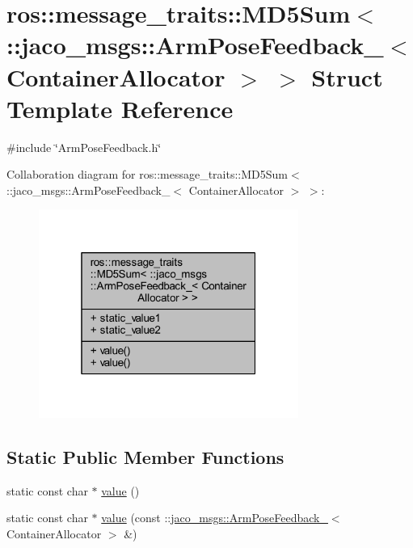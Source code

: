 \hypertarget{structros_1_1message__traits_1_1MD5Sum_3_01_1_1jaco__msgs_1_1ArmPoseFeedback___3_01ContainerAllocator_01_4_01_4}{}\section{ros\+:\+:message\+\_\+traits\+:\+:M\+D5\+Sum$<$ \+:\+:jaco\+\_\+msgs\+:\+:Arm\+Pose\+Feedback\+\_\+$<$ Container\+Allocator $>$ $>$ Struct Template Reference}
\label{structros_1_1message__traits_1_1MD5Sum_3_01_1_1jaco__msgs_1_1ArmPoseFeedback___3_01ContainerAllocator_01_4_01_4}


{\ttfamily \#include \char`\"{}Arm\+Pose\+Feedback.\+h\char`\"{}}



Collaboration diagram for ros\+:\+:message\+\_\+traits\+:\+:M\+D5\+Sum$<$ \+:\+:jaco\+\_\+msgs\+:\+:Arm\+Pose\+Feedback\+\_\+$<$ Container\+Allocator $>$ $>$\+:
\nopagebreak
\begin{figure}[H]
\begin{center}
\leavevmode
\includegraphics[width=241pt]{d1/d56/structros_1_1message__traits_1_1MD5Sum_3_01_1_1jaco__msgs_1_1ArmPoseFeedback___3_01ContainerAllocator_01_4_01_4__coll__graph}
\end{center}
\end{figure}
\subsection*{Static Public Member Functions}
\begin{DoxyCompactItemize}
\item 
static const char $\ast$ \hyperlink{structros_1_1message__traits_1_1MD5Sum_3_01_1_1jaco__msgs_1_1ArmPoseFeedback___3_01ContainerAllocator_01_4_01_4_ab5d185001853f49bbf57cd688d62420e}{value} ()
\item 
static const char $\ast$ \hyperlink{structros_1_1message__traits_1_1MD5Sum_3_01_1_1jaco__msgs_1_1ArmPoseFeedback___3_01ContainerAllocator_01_4_01_4_a20edc3725d88b74d72171aa1ae7d444f}{value} (const \+::\hyperlink{structjaco__msgs_1_1ArmPoseFeedback__}{jaco\+\_\+msgs\+::\+Arm\+Pose\+Feedback\+\_\+}$<$ Container\+Allocator $>$ \&)
\end{DoxyCompactItemize}
